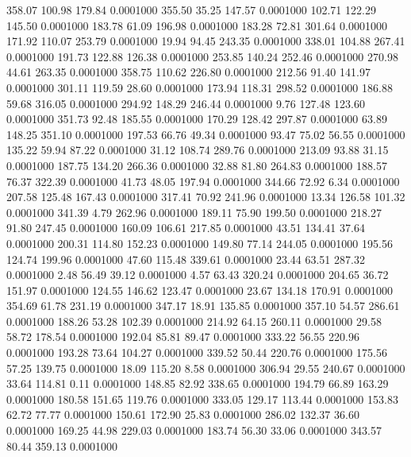  358.07  100.98  179.84   0.0001000
 355.50   35.25  147.57   0.0001000
 102.71  122.29  145.50   0.0001000
 183.78   61.09  196.98   0.0001000
 183.28   72.81  301.64   0.0001000
 171.92  110.07  253.79   0.0001000
  19.94   94.45  243.35   0.0001000
 338.01  104.88  267.41   0.0001000
 191.73  122.88  126.38   0.0001000
 253.85  140.24  252.46   0.0001000
 270.98   44.61  263.35   0.0001000
 358.75  110.62  226.80   0.0001000
 212.56   91.40  141.97   0.0001000
 301.11  119.59   28.60   0.0001000
 173.94  118.31  298.52   0.0001000
 186.88   59.68  316.05   0.0001000
 294.92  148.29  246.44   0.0001000
   9.76  127.48  123.60   0.0001000
 351.73   92.48  185.55   0.0001000
 170.29  128.42  297.87   0.0001000
  63.89  148.25  351.10   0.0001000
 197.53   66.76   49.34   0.0001000
  93.47   75.02   56.55   0.0001000
 135.22   59.94   87.22   0.0001000
  31.12  108.74  289.76   0.0001000
 213.09   93.88   31.15   0.0001000
 187.75  134.20  266.36   0.0001000
  32.88   81.80  264.83   0.0001000
 188.57   76.37  322.39   0.0001000
  41.73   48.05  197.94   0.0001000
 344.66   72.92    6.34   0.0001000
 207.58  125.48  167.43   0.0001000
 317.41   70.92  241.96   0.0001000
  13.34  126.58  101.32   0.0001000
 341.39    4.79  262.96   0.0001000
 189.11   75.90  199.50   0.0001000
 218.27   91.80  247.45   0.0001000
 160.09  106.61  217.85   0.0001000
  43.51  134.41   37.64   0.0001000
 200.31  114.80  152.23   0.0001000
 149.80   77.14  244.05   0.0001000
 195.56  124.74  199.96   0.0001000
  47.60  115.48  339.61   0.0001000
  23.44   63.51  287.32   0.0001000
   2.48   56.49   39.12   0.0001000
   4.57   63.43  320.24   0.0001000
 204.65   36.72  151.97   0.0001000
 124.55  146.62  123.47   0.0001000
  23.67  134.18  170.91   0.0001000
 354.69   61.78  231.19   0.0001000
 347.17   18.91  135.85   0.0001000
 357.10   54.57  286.61   0.0001000
 188.26   53.28  102.39   0.0001000
 214.92   64.15  260.11   0.0001000
  29.58   58.72  178.54   0.0001000
 192.04   85.81   89.47   0.0001000
 333.22   56.55  220.96   0.0001000
 193.28   73.64  104.27   0.0001000
 339.52   50.44  220.76   0.0001000
 175.56   57.25  139.75   0.0001000
  18.09  115.20    8.58   0.0001000
 306.94   29.55  240.67   0.0001000
  33.64  114.81    0.11   0.0001000
 148.85   82.92  338.65   0.0001000
 194.79   66.89  163.29   0.0001000
 180.58  151.65  119.76   0.0001000
 333.05  129.17  113.44   0.0001000
 153.83   62.72   77.77   0.0001000
 150.61  172.90   25.83   0.0001000
 286.02  132.37   36.60   0.0001000
 169.25   44.98  229.03   0.0001000
 183.74   56.30   33.06   0.0001000
 343.57   80.44  359.13   0.0001000
